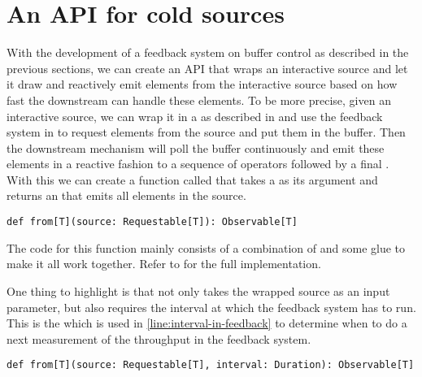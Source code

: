 \section{An API for cold sources}
With the development of a feedback system on buffer control as described in the previous sections, we can create an API that wraps an interactive source and let it draw and reactively emit elements from the interactive source based on how fast the downstream can handle these elements. To be more precise, given an interactive source, we can wrap it in a  as described in  and use the feedback system in  to request elements from the source and put them in the buffer. Then the downstream mechanism will poll the buffer continuously and emit these elements in a reactive fashion to a sequence of operators followed by a final \obv. With this we can create a function called  that takes a  as its argument and returns an  that emits all elements in the source.

\begin{lstlisting}[style=InlineScalaStyle]
def from[T](source: Requestable[T]): Observable[T]
\end{lstlisting}

The code for this function mainly consists of a combination of  and some glue to make it all work together. Refer to  for the full implementation.

One thing to highlight is that  not only takes the wrapped source as an input parameter, but also requires the interval at which the feedback system has to run. This is the  which is used in  \cref{line:interval-in-feedback} to determine when to do a next measurement of the throughput in the feedback system.

\begin{lstlisting}[style=InlineScalaStyle]
def from[T](source: Requestable[T], interval: Duration): Observable[T]
\end{lstlisting}

